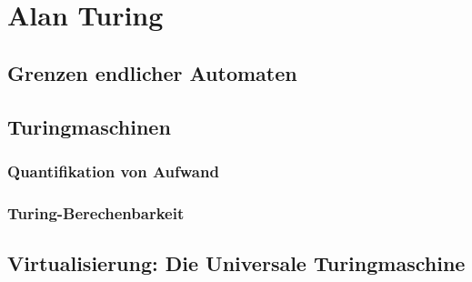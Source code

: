 \chapter{Alan Turing}
\section{Grenzen endlicher Automaten}\label{pumping}
\section{Turingmaschinen}
\subsection{Quantifikation von Aufwand}
\subsection{Turing-Berechenbarkeit}
\section{Virtualisierung: Die Universale Turingmaschine}

